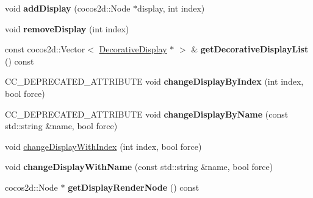 \begin{DoxyCompactItemize}
\item 
\mbox{\label{classcocostudio_1_1DisplayManager_a2af09bbaa5e3257f00454a024192539c}} 
void {\bfseries add\+Display} (cocos2d\+::\+Node $\ast$display, int index)
\item 
\mbox{\label{classcocostudio_1_1DisplayManager_a1cbf5ea934a66829aceb5d3d48899786}} 
void {\bfseries remove\+Display} (int index)
\item 
\mbox{\label{classcocostudio_1_1DisplayManager_ab17f4d38fc6ce2107fc9e2369cd80c12}} 
const cocos2d\+::\+Vector$<$ \hyperlink{classcocostudio_1_1DecorativeDisplay}{Decorative\+Display} $\ast$ $>$ \& {\bfseries get\+Decorative\+Display\+List} () const
\item 
\mbox{\label{classcocostudio_1_1DisplayManager_a4a36d9fee14cae46726470ba18132a48}} 
C\+C\+\_\+\+D\+E\+P\+R\+E\+C\+A\+T\+E\+D\+\_\+\+A\+T\+T\+R\+I\+B\+U\+TE void {\bfseries change\+Display\+By\+Index} (int index, bool force)
\item 
\mbox{\label{classcocostudio_1_1DisplayManager_a06dc3789c6e53d710db3fec45edbac27}} 
C\+C\+\_\+\+D\+E\+P\+R\+E\+C\+A\+T\+E\+D\+\_\+\+A\+T\+T\+R\+I\+B\+U\+TE void {\bfseries change\+Display\+By\+Name} (const std\+::string \&name, bool force)
\item 
void \hyperlink{classcocostudio_1_1DisplayManager_ab0a8f7711c50c31d0c569c35bc62b4b2}{change\+Display\+With\+Index} (int index, bool force)
\item 
\mbox{\label{classcocostudio_1_1DisplayManager_a6c618f38a7a554dd5ce8ba2a25d229dc}} 
void {\bfseries change\+Display\+With\+Name} (const std\+::string \&name, bool force)
\item 
\mbox{\label{classcocostudio_1_1DisplayManager_a40421a694900a9c439df1e172be4a71f}} 
cocos2d\+::\+Node $\ast$ {\bfseries get\+Display\+Render\+Node} () const
\item 
\mbox{\label{classcocostudio_1_1DisplayManager_aa9db0421fb1c17b9f61d32152fafb2eb}} 

\end{DoxyCompactItemize}
